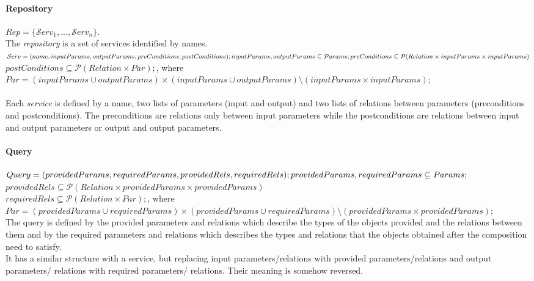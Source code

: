 \documentclass[12pt]{article}
\theoremstyle{definition}
\begin{document}
	\paragraph{Repository} $Rep = \{ \mathcal{S}erv_1, ..., \mathcal{S}erv_n \}$. \\
		The \textit{repository} is a set of services identified by names.\\
		$\mathcal{S}erv = (name, inputParams, outputParams, preConditions, postConditions); \\
		inputParams, outputParams \subseteq \mathcal{P}arams;\\ 
		preConditions \subseteq \mathcal{P}(Relation \times inputParams \times inputParams)$ \\
		$postConditions \subseteq \mathcal{P}(Relation \times Par);$, where 
		$Par = (inputParams \cup outputParams) \times (inputParams \cup outputParams) \setminus
		(inputParams \times inputParams );$\\\\
		Each \textit{service} is defined by a name, two lists of parameters (input and output) and two lists of relations between parameters (preconditions and postconditions). The preconditions are relations only between input parameters while the postconditions are relations between input and output parameters or output and output parameters.
	\par
	
	\paragraph{Query}
		$ Query = ( providedParams, requiredParams, providedRels, requiredRels ); \\ 
		  providedParams, requiredParams \subseteq Params;$ \\ 
		  $providedRels \subseteq \mathcal{P}(Relation \times providedParams \times providedParams)$ \\
		  $requiredRels \subseteq \mathcal{P}(Relation \times Par);$, where 
		  $Par = (providedParams \cup requiredParams) \times (providedParams \cup requiredParams) \setminus (providedParams \times providedParams );$\\
		  The query is defined by the provided parameters and relations which describe the types of the objects provided and the relations between them and by the required parameters and relations which describes the types and relations that the objects obtained after the composition need to satisfy. \\ %
		  It has a similar structure with a service, but replacing input parameters/relations with provided parameters/relations and output parameters/ relations with required parameters/ relations. Their meaning is somehow reversed. 
	\par
	
\end{document}
